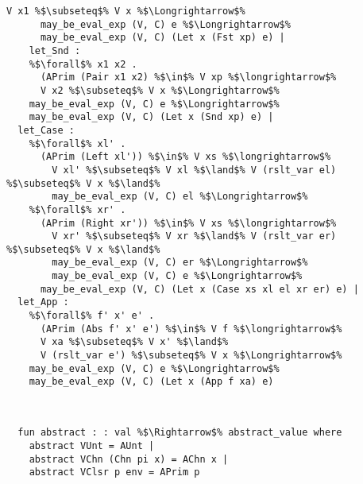 \documentclass{article}
\begin{document}
\begin{lstlisting}[style=codestyle1, escapechar=\%]
        V x1 %$\subseteq$% V x %$\Longrightarrow$% 
      may_be_eval_exp (V, C) e %$\Longrightarrow$% 
      may_be_eval_exp (V, C) (Let x (Fst xp) e) |
    let_Snd : 
    %$\forall$% x1 x2 .
      (APrim (Pair x1 x2) %$\in$% V xp %$\longrightarrow$%
      V x2 %$\subseteq$% V x %$\Longrightarrow$% 
    may_be_eval_exp (V, C) e %$\Longrightarrow$% 
    may_be_eval_exp (V, C) (Let x (Snd xp) e) |
  let_Case :
    %$\forall$% xl' .
      (APrim (Left xl')) %$\in$% V xs %$\longrightarrow$%
        V xl' %$\subseteq$% V xl %$\land$% V (rslt_var el) %$\subseteq$% V x %$\land$%
        may_be_eval_exp (V, C) el %$\Longrightarrow$%
    %$\forall$% xr' .
      (APrim (Right xr')) %$\in$% V xs %$\longrightarrow$%
        V xr' %$\subseteq$% V xr %$\land$% V (rslt_var er) %$\subseteq$% V x %$\land$%
        may_be_eval_exp (V, C) er %$\Longrightarrow$%
        may_be_eval_exp (V, C) e %$\Longrightarrow$% 
      may_be_eval_exp (V, C) (Let x (Case xs xl el xr er) e) |
  let_App :
    %$\forall$% f' x' e' .
      (APrim (Abs f' x' e') %$\in$% V f %$\longrightarrow$%
      V xa %$\subseteq$% V x' %$\land$%
      V (rslt_var e') %$\subseteq$% V x %$\Longrightarrow$% 
    may_be_eval_exp (V, C) e %$\Longrightarrow$% 
    may_be_eval_exp (V, C) (Let x (App f xa) e)

  \end{lstlisting}
\begin{lstlisting}[style=codestyle1, escapechar=\%]


  fun abstract : : val %$\Rightarrow$% abstract_value where
    abstract VUnt = AUnt |
    abstract VChn (Chn pi x) = AChn x |
    abstract VClsr p env = APrim p

  \end{lstlisting}
\end{document}
